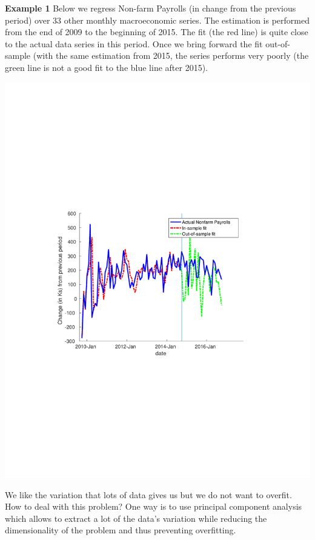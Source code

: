 \documentclass[11pt]{article}
\theoremstyle{definition}
\begin{document}
\begin{shaded}
\textbf{Example 1} \newline
Below we regress Non-farm Payrolls (in change from the previous period) over 33 other monthly macroeconomic series. The estimation is performed from the end of 2009 to the beginning of 2015. The fit (the red line) is quite close to the actual data series in this period. Once we bring forward the fit out-of-sample (with the same estimation from 2015, the series performs very poorly (the green line is not a good fit to the blue line after 2015).
\begin{center}
\includegraphics[scale=0.6,trim={0cm, 8cm, 0cm, 8cm}, clip]{plots/cursefit.pdf}
\end{center}
\end{shaded}			

We like the variation that lots of data gives us but we do not want to overfit. How to deal with this problem? One way is to use principal component analysis which allows to extract a lot of the data's variation while reducing the dimensionality of the problem and thus preventing overfitting.
\end{document}
